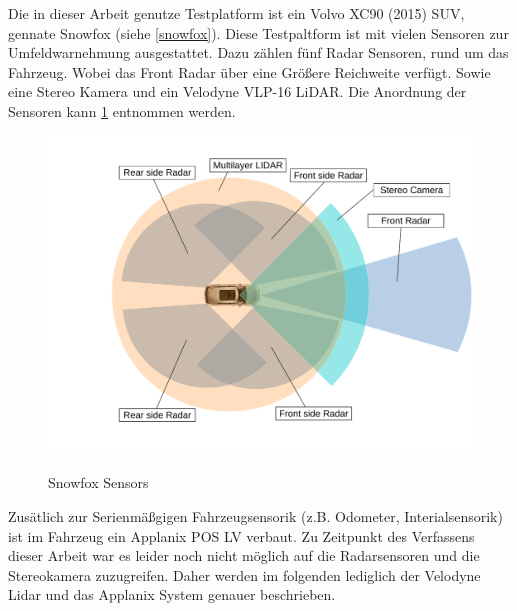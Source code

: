 Die in dieser Arbeit genutze Testplatform ist ein Volvo XC90 (2015) SUV, gennate Snowfox (siehe \cref{snowfox}). Diese Testpaltform ist mit vielen Sensoren zur Umfeldwarnehmung ausgestattet.
Dazu zählen fünf Radar Sensoren, rund um das Fahrzeug. Wobei das Front Radar über eine Größere Reichweite verfügt. Sowie eine
Stereo Kamera und ein Velodyne VLP-16 LiDAR. Die Anordnung der Sensoren kann \cref{platform} entnommen werden.


\begin{figure}[!ht]
\caption{Snowfox Sensors}
\includegraphics[width=\columnwidth]{sensors.pdf}
\label{platform}
\end{figure}


Zusätlich zur Serienmäßgigen Fahrzeugsensorik (z.B. Odometer, Interialsensorik) ist im Fahrzeug ein Applanix POS LV verbaut. Zu Zeitpunkt des Verfassens dieser Arbeit war es leider noch nicht möglich auf
die Radarsensoren und die Stereokamera zuzugreifen. Daher werden im folgenden lediglich der Velodyne Lidar und das Applanix System genauer beschrieben.

